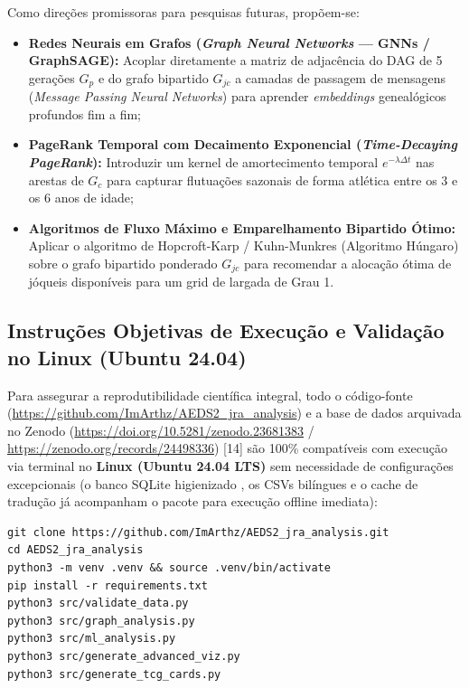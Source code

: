 \documentclass[conference]{IEEEtran}
\begin{document}
Como direções promissoras para pesquisas futuras, propõem-se:
\begin{itemize}
    \item \textbf{Redes Neurais em Grafos (\textit{Graph Neural Networks} --- GNNs / GraphSAGE):} Acoplar diretamente a matriz de adjacência do DAG de 5 gerações $G_p$ e do grafo bipartido $G_{jc}$ a camadas de passagem de mensagens (\textit{Message Passing Neural Networks}) para aprender \textit{embeddings} genealógicos profundos fim a fim;
    \item \textbf{PageRank Temporal com Decaimento Exponencial (\textit{Time-Decaying PageRank}):} Introduzir um kernel de amortecimento temporal $e^{-\lambda \Delta t}$ nas arestas de $G_c$ para capturar flutuações sazonais de forma atlética entre os 3 e os 6 anos de idade;
    \item \textbf{Algoritmos de Fluxo Máximo e Emparelhamento Bipartido Ótimo:} Aplicar o algoritmo de Hopcroft-Karp / Kuhn-Munkres (Algoritmo Húngaro) sobre o grafo bipartido ponderado $G_{jc}$ para recomendar a alocação ótima de jóqueis disponíveis para um grid de largada de Grau 1.
\end{itemize}

\subsection{Instruções Objetivas de Execução e Validação no Linux (Ubuntu 24.04)}
Para assegurar a reprodutibilidade científica integral, todo o código-fonte (\url{https://github.com/ImArthz/AEDS2_jra_analysis}) e a base de dados arquivada no Zenodo (\url{https://doi.org/10.5281/zenodo.23681383} / \url{https://zenodo.org/records/24498336}) [14] são 100\%
compatíveis com execução via terminal no \textbf{Linux (Ubuntu 24.04 LTS)} sem necessidade de configurações excepcionais (o banco SQLite higienizado , os CSVs bilíngues e o cache de tradução  já acompanham o pacote para execução offline imediata):
\begin{footnotesize}
\begin{verbatim}
git clone https://github.com/ImArthz/AEDS2_jra_analysis.git
cd AEDS2_jra_analysis
python3 -m venv .venv && source .venv/bin/activate
pip install -r requirements.txt
python3 src/validate_data.py
python3 src/graph_analysis.py
python3 src/ml_analysis.py
python3 src/generate_advanced_viz.py
python3 src/generate_tcg_cards.py
\end{verbatim}
\end{footnotesize}
\end{document}
